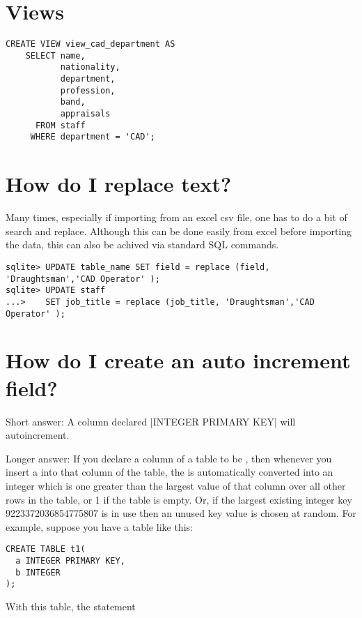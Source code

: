 \section{Views}

\begin{verbatim}
CREATE VIEW view_cad_department AS
    SELECT name,
           nationality,
           department,
           profession,
           band,
           appraisals
      FROM staff
     WHERE department = 'CAD';
\end{verbatim}


\section{How do I replace text?}

Many times, especially if importing from an excel csv file, one has to do a bit of search and replace. Although this can be done 
easily from excel before importing the data, this can also be achived via standard SQL commands.

\begin{verbatim}
sqlite> UPDATE table_name SET field = replace (field, 'Draughtsman','CAD Operator' );
sqlite> UPDATE staff 
...>    SET job_title = replace (job_title, 'Draughtsman','CAD Operator' );
\end{verbatim}


\section{How do I create an auto increment field?}

Short answer: A column declared |INTEGER PRIMARY KEY| will autoincrement.

Longer answer: If you declare a column of a table to be , then whenever you insert a  into that column of the table, the  is automatically converted into an integer which is one greater than the largest value of that column over all other rows in the table, or 1 if the table is empty. Or, if the largest existing integer key 9223372036854775807 is in use then an unused key value is chosen at random. For example, suppose you have a table like this:


\begin{verbatim}
CREATE TABLE t1(
  a INTEGER PRIMARY KEY,
  b INTEGER
);
\end{verbatim}


With this table, the statement


